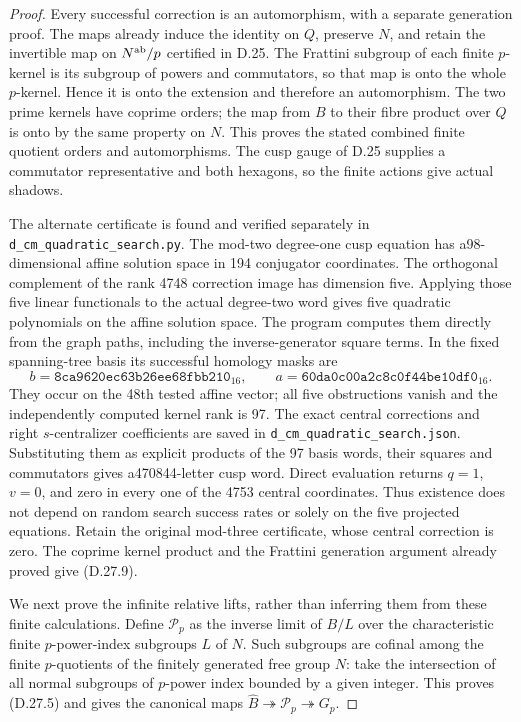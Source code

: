 \begin{proof}
Every successful correction is an automorphism, with a
separate generation proof. The maps already induce the
identity on $Q$, preserve $N$, and retain the invertible
map on $N^{\rm ab}/p$ certified in D.25. The Frattini
subgroup of each finite $p$-kernel is its subgroup of
powers and commutators, so that map is onto the whole
$p$-kernel. Hence it is onto the extension and therefore
an automorphism. The two prime kernels have coprime orders;
the map from $B$ to their fibre product over $Q$ is onto
by the same property on $N$. This proves the stated
combined finite quotient orders and automorphisms.
The cusp gauge of D.25 supplies a commutator representative
and both hexagons, so the finite actions give actual shadows.

The alternate certificate is found and verified separately
in \texttt{d\_cm\_quadratic\_search.py}. The mod-two
degree-one cusp equation has a98-dimensional affine
solution space in 194 conjugator coordinates. The
orthogonal complement of the rank 4748 correction image
has dimension five. Applying those five linear
functionals to the actual degree-two word gives five
quadratic polynomials on the affine solution space.
The program computes them directly from the graph paths,
including the inverse-generator square terms. In the
fixed spanning-tree basis its successful homology masks are
\[
 b=\texttt{8ca9620ec63b26ee68fbb210}_{16},\qquad
 a=\texttt{60da0c00a2c8c0f44be10df0}_{16}.                \tag{D.27.10}
\]
They occur on the 48th tested affine vector; all five
obstructions vanish and the independently computed
kernel rank is 97. The exact central corrections and
right $s$-centralizer coefficients are saved in
\texttt{d\_cm\_quadratic\_search.json}. Substituting
them as explicit products of the 97 basis words, their
squares and commutators gives a470844-letter cusp word.
Direct evaluation returns $q=1$, $v=0$, and zero in
every one of the 4753 central coordinates. Thus existence
does not depend on random search success rates or solely
on the five projected equations. Retain the original
mod-three certificate, whose central correction is zero.
The coprime kernel product and the Frattini generation
argument already proved give (D.27.9).

We next prove the infinite relative lifts, rather than
inferring them from these finite calculations. Define
$\mathcal P_p$ as the inverse limit of $B/L$ over the
characteristic finite $p$-power-index subgroups $L$ of $N$.
Such subgroups are cofinal among the finite $p$-quotients
of the finitely generated free group $N$: take the
intersection of all normal subgroups of $p$-power index
bounded by a given integer.
This proves (D.27.5) and gives the canonical maps
$\widehat B\twoheadrightarrow\mathcal P_p\twoheadrightarrow G_p$.


\end{proof}

